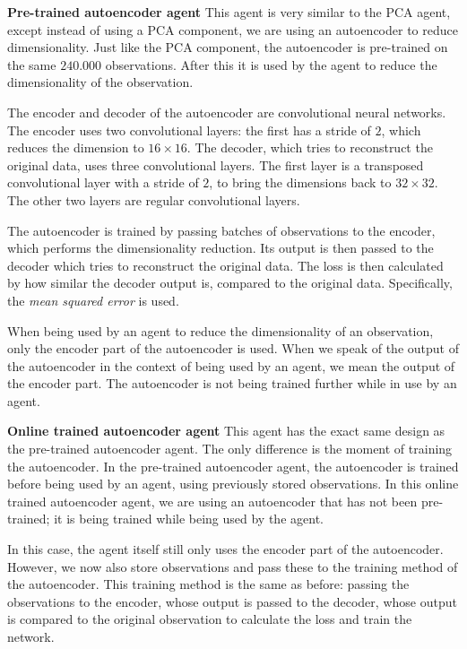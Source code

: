 \noindent \textbf{Pre-trained autoencoder agent}\newline
\noindent This agent is very similar to the PCA agent, except instead of using a PCA component, we are using an autoencoder to reduce dimensionality. Just like the PCA component, the autoencoder is pre-trained on the same $240.000$ observations. After this it is used by the agent to reduce the dimensionality of the observation. 

The encoder and decoder of the autoencoder are convolutional neural networks. The encoder uses two convolutional layers: the first has a stride of $2$, which reduces the dimension to $16 \times 16$. The decoder, which tries to reconstruct the original data, uses three convolutional layers. The first layer is a transposed convolutional layer with a stride of $2$, to bring the dimensions back to $32 \times 32$. The other two layers are regular convolutional layers. 

The autoencoder is trained by passing batches of observations to the encoder, which performs the dimensionality reduction. Its output is then passed to the decoder which tries to reconstruct the original data. The loss is then calculated by how similar the decoder output is, compared to the original data. Specifically, the \emph{mean squared error} is used.

When being used by an agent to reduce the dimensionality of an observation, only the encoder part of the autoencoder is used. When we speak of the output of the autoencoder in the context of being used by an agent, we mean the output of the encoder part. The autoencoder is not being trained further while in use by an agent. \newline
 
\noindent \textbf{Online trained autoencoder agent}\newline
\noindent  This agent has the exact same design as the pre-trained autoencoder agent. The only difference is the moment of training the autoencoder. In the pre-trained autoencoder agent, the autoencoder is trained before being used by an agent, using previously stored observations. In this online trained autoencoder agent, we are using an autoencoder that has not been pre-trained; it is being trained while being used by the agent. 

In this case, the agent itself still only uses the encoder part of the autoencoder. However, we now also store observations and pass these to the training method of the autoencoder. This training method is the same as before: passing the observations to the encoder, whose output is passed to the decoder, whose output is compared to the original observation to calculate the loss and train the network.\newline

